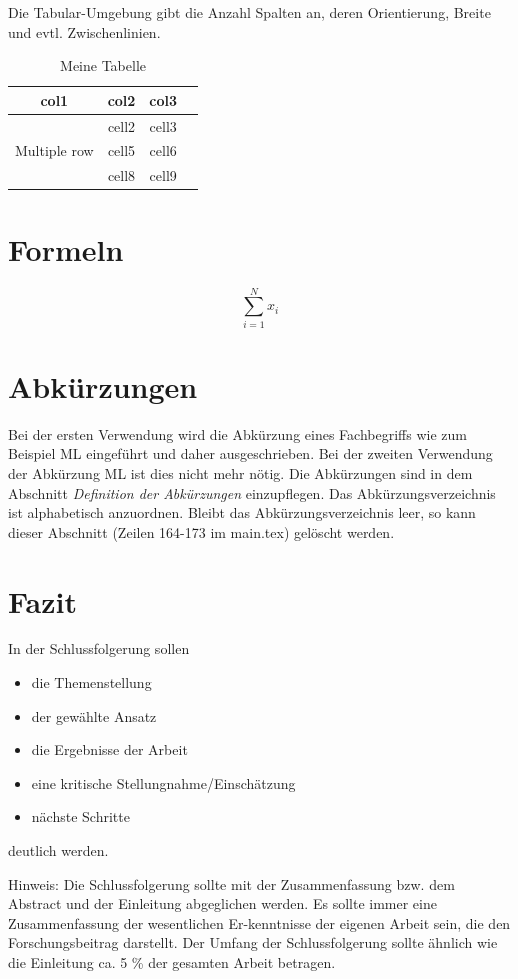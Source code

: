 Die Tabular-Umgebung gibt die Anzahl Spalten an, deren Orientierung, Breite und evtl. Zwischenlinien. 


\begin{table}[ht]
    \centering
    \caption{Meine Tabelle}
        \begin{tabular}{ cccc } 
        \toprule
        col1 & col2 & col3 \\
        \midrule
        \multirow{3}{4em}{Multiple row} & cell2 & cell3 \\ 
        & cell5 & cell6 \\ 
        & cell8 & cell9 \\ 
        \bottomrule
    \end{tabular}
    \label{tab:countries}
\end{table}

\section{Formeln}

\begin{equation}
    \sum_{i=1}^N x_i
    \label{eq:1}
\end{equation}

\section{Abkürzungen}
Bei der ersten Verwendung wird die Abkürzung eines Fachbegriffs wie zum Beispiel \ac{ML} eingeführt und daher ausgeschrieben. Bei der zweiten Verwendung der Abkürzung \ac{ML} ist dies nicht mehr nötig. Die Abkürzungen sind in dem Abschnitt \textit{Definition der Abkürzungen} einzupflegen. Das Abkürzungsverzeichnis ist alphabetisch anzuordnen. Bleibt das Abkürzungsverzeichnis leer, so kann dieser Abschnitt (Zeilen 164-173 im main.tex) gelöscht werden.


\section{Fazit}
In der Schlussfolgerung sollen

\begin{itemize}
\item die Themenstellung
\item der gewählte Ansatz
\item die Ergebnisse der Arbeit
\item eine kritische Stellungnahme/Einschätzung
\item nächste Schritte
\end{itemize}
deutlich werden.

Hinweis:
Die Schlussfolgerung sollte mit der Zusammenfassung bzw. dem Abstract und der Einleitung abgeglichen werden. Es sollte immer eine Zusammenfassung der wesentlichen Er-kenntnisse der eigenen Arbeit sein, die den Forschungsbeitrag darstellt. Der Umfang der Schlussfolgerung sollte ähnlich wie die Einleitung ca. 5 \% der gesamten Arbeit betragen.

